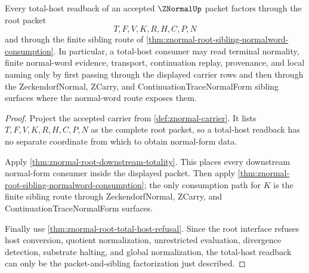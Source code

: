 \begin{theorem}
\label{thm:znormal-root-total-host-readback-factorization}
Every total-host readback of an accepted $\ZNormalUp$ packet factors through the root packet
$$
T,F,V,K,R,H,C,P,N
$$
and through the finite sibling route of \autoref{thm:znormal-root-sibling-normalword-consumption}. In particular, a total-host consumer may read terminal normality, finite normal-word evidence, transport, continuation replay, provenance, and local naming only by first passing through the displayed carrier rows and then through the ZeckendorfNormal, ZCarry, and ContinuationTraceNormalForm sibling surfaces where the normal-word route exposes them.
\end{theorem}
\begin{proof}
Project the accepted carrier from \autoref{def:znormal-carrier}. It lists $T,F,V,K,R,H,C,P,N$ as the complete root packet, so a total-host readback has no separate coordinate from which to obtain normal-form data.

Apply \autoref{thm:znormal-root-downstream-totality}. This places every downstream normal-form consumer inside the displayed packet. Then apply \autoref{thm:znormal-root-sibling-normalword-consumption}; the only consumption path for $K$ is the finite sibling route through ZeckendorfNormal, ZCarry, and ContinuationTraceNormalForm surfaces.

Finally use \autoref{thm:znormal-root-total-host-refusal}. Since the root interface refuses host conversion, quotient normalization, unrestricted evaluation, divergence detection, substrate halting, and global normalization, the total-host readback can only be the packet-and-sibling factorization just described.
\end{proof}

